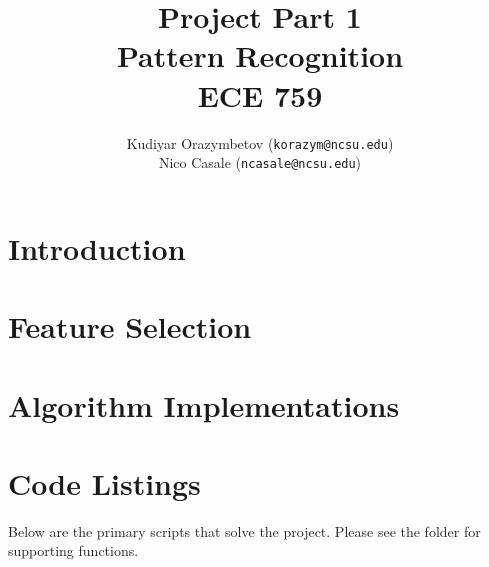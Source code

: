 \documentclass[]{ncmathy}
\newcommand{\theassignment}{Project Part 1}
\newcommand{\thecourse}{Pattern Recognition\\ECE 759}
\begin{document}
\title{\theassignment\\\thecourse}
\author{Kudiyar Orazymbetov (\texttt{korazym@ncsu.edu})\\Nico Casale (\texttt{ncasale@ncsu.edu})}

\makeFancyTitle

\tableofcontents
\listoffigures
\lstlistoflistings

\pagebreak

\section{Introduction} 
	

\section{Feature Selection}
	

\section{Algorithm Implementations}
	

\section{Code Listings}

Below are the primary scripts that solve the project. Please see the
 folder for supporting functions.

%
\end{document}
